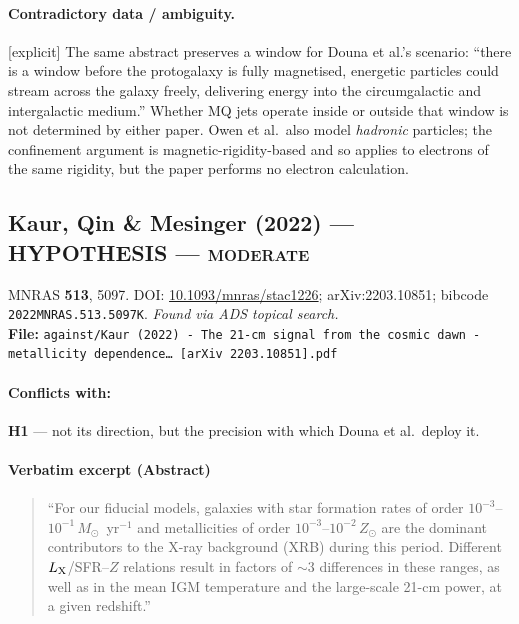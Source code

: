 \documentclass[11pt,a4paper]{article}
\newcommand{\HYP}{\textcolor{blue!60!black}{\textbf{HYPOTHESIS}}}
\newcommand{\flag}[1]{\textcolor{orange!75!black}{\textsf{\small [#1]}}}
\begin{document}
\paragraph{Contradictory data / ambiguity.} \flag{explicit}
The same abstract preserves a window for Douna et al.'s scenario: ``there is a
window before the protogalaxy is fully magnetised, energetic particles could
stream across the galaxy freely, delivering energy into the circumgalactic and
intergalactic medium.'' Whether MQ jets operate inside or outside that window is
not determined by either paper. Owen et al.\ also model \emph{hadronic}
particles; the confinement argument is magnetic-rigidity-based and so applies to
electrons of the same rigidity, but the paper performs no electron calculation.

\subsection{Kaur, Qin \& Mesinger (2022) --- \HYP{} --- \textsc{moderate}}
\noindent MNRAS \textbf{513}, 5097. DOI:
\href{https://doi.org/10.1093/mnras/stac1226}{10.1093/mnras/stac1226};
arXiv:2203.10851; bibcode \texttt{2022MNRAS.513.5097K}.
\emph{Found via ADS topical search.}\\
\textbf{File:} \texttt{against/Kaur (2022) - The 21-cm signal from the cosmic dawn - metallicity dependence\dots\ [arXiv 2203.10851].pdf}

\paragraph{Conflicts with:} \textbf{H1} --- not its direction, but the precision
with which Douna et al.\ deploy it.

\paragraph{Verbatim excerpt (Abstract)}
\begin{quote}\small
``For our fiducial models, galaxies with star formation rates of order
$10^{-3}$--$10^{-1}\,M_\odot$~yr$^{-1}$ and metallicities of order
$10^{-3}$--$10^{-2}\,Z_\odot$ are the dominant contributors to the X-ray
background (XRB) during this period. Different $L_{\rm X}$/SFR--$Z$ relations
result in factors of $\sim3$ differences in these ranges, as well as in the mean
IGM temperature and the large-scale 21-cm power, at a given redshift.''
\end{quote}
\end{document}
